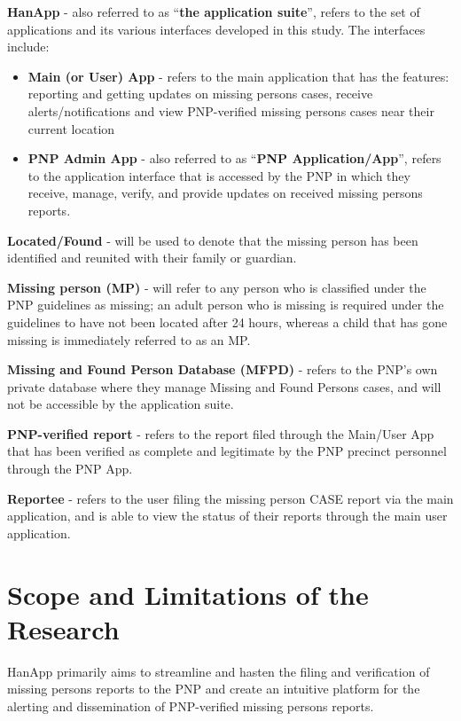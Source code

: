 \textbf{HanApp} -  also referred to as “\textbf{the application suite}”, refers to the set of applications and its various interfaces developed in this study. The interfaces include:
\begin{itemize}
    \item \textbf{Main (or User) App} - refers to the main application that has the features: reporting and getting updates on missing persons cases, receive alerts/notifications and view PNP-verified missing persons cases near their current location
    \item \textbf{PNP Admin App} - also referred to as “\textbf{PNP Application/App}”, refers to the application interface that is accessed by the PNP in which they receive, manage, verify, and provide updates on received missing persons reports.
\end{itemize}

\textbf{Located/Found} - will be used to denote that the missing person has been identified and reunited with their family or guardian.

\textbf{Missing person (MP)} - will refer to any person who is classified under the PNP guidelines as missing; an adult person who is missing is required under the guidelines to have not been located after 24 hours, whereas a child that has gone missing is immediately referred to as an MP.

\textbf{Missing and Found Person Database (MFPD)} - refers to the PNP’s own private database where they manage Missing and Found Persons cases, and will not be accessible by the application suite.

\textbf{PNP-verified report} - refers to the report filed through the Main/User App that has been verified as complete and legitimate by the PNP precinct personnel through the PNP App.

\textbf{Reportee} - refers to the user filing the missing person CASE report via the main application, and is able to view the status of their reports through the main user application.

\section{Scope and Limitations of the Research}
\label{sec:scopelimitations}

HanApp primarily aims to streamline and hasten the filing and verification of missing persons reports to the PNP and create an intuitive platform for the alerting and dissemination of PNP-verified missing persons reports.

